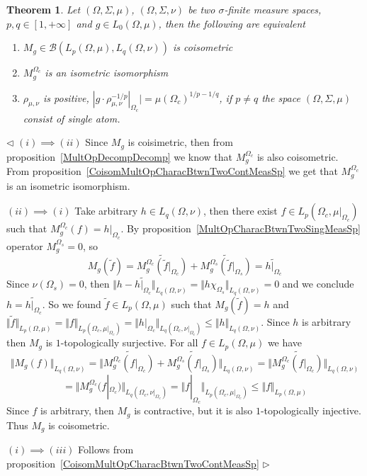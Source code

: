 \documentclass[12pt]{article}
\newtheorem{theorem}{Theorem}[subsection]
\newenvironment{proof}{\par $\triangleleft$}{$\triangleright$}
\begin{document}
\begin{theorem}\label{CoisomMultOpCharacBtwnTwoMeasSp}
    Let $(\Omega,\Sigma,\mu)$, $(\Omega,\Sigma,\nu)$ be two $\sigma$-finite
    measure spaces, $p,q\in[1,+\infty]$ and $g\in L_0(\Omega,\mu)$, then the
    following are equivalent
    \begin{enumerate}[label = (\roman*)]
        \item $M_g\in\mathcal{B}(L_p(\Omega,\mu), L_q(\Omega,\nu))$ is
              coisometric

        \item $M_g^{\Omega_c}$ is an isometric isomorphism

        \item $\rho_{\mu,\nu}$ is positive,
              $|g\cdot\rho_{\mu,\nu}^{-1/p}|_{\Omega_c}|={\mu(\Omega_c)}^{1/p-1/q}$,
              if $p\neq q$ the space $(\Omega,\Sigma,\mu)$ consist of single atom.
    \end{enumerate}
\end{theorem}
\begin{proof} $(i)\implies (ii)$ Since $M_g$ is coisimetric, then from
    proposition~\ref{MultOpDecompDecomp} we know that $M_g^{\Omega_c}$ is also
    coisometric. From proposition~\ref{CoisomMultOpCharacBtwnTwoContMeasSp} we
    get that $M_g^{\Omega_c}$ is an isometric isomorphism.

    $(ii)\implies (i)$ Take arbitrary $h\in L_q(\Omega,\nu)$, then there
    exist $f\in L_p(\Omega_c,\mu|_{\Omega_c})$ such that
    $M_g^{\Omega_c}(f)=h|_{\Omega_c}$. By
    proposition~\ref{MultOpCharacBtwnTwoSingMeasSp} operator
    $M_g^{\Omega_s}=0$, so
    $$
        M_g(\widetilde{f})
        =\widetilde{M_g^{\Omega_c}(\widetilde{f}|_{\Omega_c})}
        +\widetilde{M_g^{\Omega_s}(\widetilde{f}|_{\Omega_s})}
        =\widetilde{h|_{\Omega_c}}
    $$
    Since $\nu(\Omega_s)=0$, then
    $\Vert h-\widetilde{h|_{\Omega_c}}\Vert_{L_q(\Omega,\nu)}
        =\Vert h\chi_{\Omega_s}\Vert_{L_q(\Omega,\nu)}=0$ and we conclude
    $h=\widetilde{h|_{\Omega_c}}$. So we found
    $\widetilde{f}\in L_p(\Omega,\mu)$ such that
    $M_g(\widetilde{f})=h$ and
    $\Vert \widetilde{f}\Vert_{L_p(\Omega,\mu)}
        =\Vert f\Vert_{L_p(\Omega_c,\mu|_{\Omega_c})}
        =\Vert h|_{\Omega_c}\Vert_{L_q(\Omega_c,\nu|_{\Omega_c})}
        \leq\Vert h\Vert_{L_q(\Omega,\nu)}$. Since $h$ is arbitrary then
    $M_g$ is $1$-topologically surjective. For all
    $f\in L_p(\Omega,\mu)$ we have
    $$
        \Vert M_g(f)\Vert_{L_q(\Omega,\nu)}
        =\Vert\widetilde{M_g^{\Omega_c}(f|_{\Omega_c})}
        +\widetilde{M_g^{\Omega_s}(f|_{\Omega_s})}\Vert_{L_q(\Omega,\nu)}
        =\Vert\widetilde{M_g^{\Omega_c}(f|_{\Omega_c})}\Vert_{L_q(\Omega,\nu)}
    $$
    $$
        =\Vert
        M_g^{\Omega_c}(f|_{\Omega_c})\Vert_{L_q(\Omega_c,\nu|_{\Omega_c})}
        =\Vert f|_{\Omega_c}\Vert_{L_p(\Omega_c,\mu|_{\Omega_c})} \leq\Vert f
        \Vert_{L_p(\Omega,\mu)}
    $$
    Since $f$ is arbitrary, then $M_g$ is contractive, but it is also
    $1$-topologically injective. Thus $M_g$ is coisometric.

    $(i)\implies (iii)$ Follows from
    proposition~\ref{CoisomMultOpCharacBtwnTwoContMeasSp}
\end{proof}
\end{document}
